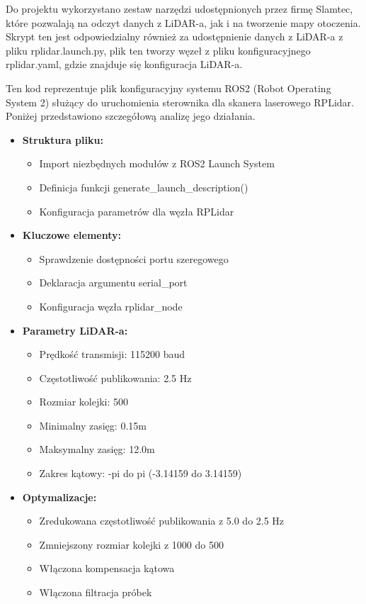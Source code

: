 \documentclass[a4paper,twoside,12pt]{book}
\begin{document}
Do projektu wykorzystano zestaw narzędzi udostępnionych przez firmę Slamtec, które pozwalają na odczyt danych z LiDAR-a, jak i na tworzenie mapy otoczenia. Skrypt ten jest odpowiedzialny również za udostępnienie danych z LiDAR-a z pliku rplidar.launch.py, plik ten tworzy węzeł z pliku konfiguracyjnego rplidar.yaml, gdzie znajduje się konfiguracja LiDAR-a.



Ten kod reprezentuje plik konfiguracyjny systemu ROS2 (Robot Operating System 2) służący do uruchomienia sterownika dla skanera laserowego RPLidar. Poniżej przedstawiono szczegółową analizę jego działania.


\begin{itemize}
\item \textbf{Struktura pliku:}
	\begin{itemize}
	\item Import niezbędnych modułów z ROS2 Launch System
	\item Definicja funkcji generate\_launch\_description()
	\item Konfiguracja parametrów dla węzła RPLidar
	\end{itemize}

\item \textbf{Kluczowe elementy:}
	\begin{itemize}
	\item Sprawdzenie dostępności portu szeregowego
	\item Deklaracja argumentu serial\_port
	\item Konfiguracja węzła rplidar\_node
	\end{itemize}

\item \textbf{Parametry LiDAR-a:}
	\begin{itemize}
	\item Prędkość transmisji: 115200 baud
	\item Częstotliwość publikowania: 2.5 Hz
	\item Rozmiar kolejki: 500
	\item Minimalny zasięg: 0.15m
	\item Maksymalny zasięg: 12.0m
	\item Zakres kątowy: -pi do pi (-3.14159 do 3.14159)
	\end{itemize}

\item \textbf{Optymalizacje:}
	\begin{itemize}
	\item Zredukowana częstotliwość publikowania z 5.0 do 2.5 Hz
	\item Zmniejszony rozmiar kolejki z 1000 do 500
	\item Włączona kompensacja kątowa
	\item Włączona filtracja próbek
	\end{itemize}
\end{itemize}
\end{document}
